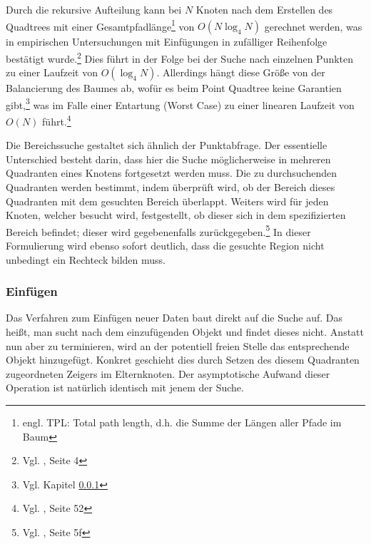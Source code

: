 \documentclass[%
			paper=a4,%
			DIV12,
			liststotoc,
			bibtotoc,
			draft=false,%
			titlepage,
			numbers=noendperiod
			]{scrartcl}
\newcommand{\zit}[3]{#1 \cite{#2}, #3}
\newcommand{\footzit}[3]{\footnote{\zit{#1}{#2}{#3}}}
\begin{document}
Durch die rekursive Aufteilung kann bei $N$ Knoten nach dem Erstellen des Quadtrees mit einer Gesamtpfadlänge\footnote{engl. TPL: Total path length, d.h. die Summe der Längen aller Pfade im Baum} von
$O(N \log_4 N)$ gerechnet werden,
was in empirischen Untersuchungen mit Einfügungen in zufälliger Reihenfolge bestätigt wurde.\footzit{Vgl.}{DBLP:journals/acta/FinkelB74}{Seite 4}
Dies führt in der Folge bei der Suche nach einzelnen Punkten zu einer Laufzeit von $O(\log_4 N)$.
Allerdings hängt diese Größe von der Balancierung des Baumes ab, wofür es beim Point Quadtree keine Garantien gibt,\footnote{Vgl. Kapitel \ref{sec:pointquadtree:insert}}
was im Falle einer Entartung (Worst Case) zu einer linearen Laufzeit von $O(N)$ führt.\footzit{Vgl.}{Samet90}{Seite 52}

Die Bereichssuche gestaltet sich ähnlich der Punktabfrage.
Der essentielle Unterschied besteht darin, dass hier die Suche möglicherweise in mehreren Quadranten eines Knotens fortgesetzt werden muss.
Die zu durchsuchenden Quadranten werden bestimmt, indem überprüft wird, ob der Bereich dieses Quadranten mit dem gesuchten Bereich überlappt.
Weiters wird für jeden Knoten, welcher besucht wird, festgestellt, ob dieser sich in dem spezifizierten Bereich befindet; dieser wird gegebenenfalls zurückgegeben.\footzit{Vgl.}{DBLP:journals/acta/FinkelB74}{Seite 5f}
In dieser Formulierung wird ebenso sofort deutlich, dass die gesuchte Region nicht unbedingt ein Rechteck bilden muss.


\subsubsection{Einfügen}
\label{sec:pointquadtree:insert}
Das Verfahren zum Einfügen neuer Daten baut direkt auf die Suche auf.
Das heißt, man sucht nach dem einzufügenden Objekt und findet dieses nicht.
Anstatt nun aber zu terminieren, wird an der potentiell freien Stelle das entsprechende Objekt hinzugefügt.
Konkret geschieht dies durch Setzen des diesem Quadranten zugeordneten Zeigers im Elternknoten.
Der asymptotische Aufwand dieser Operation ist natürlich identisch mit jenem der Suche.
\end{document}
